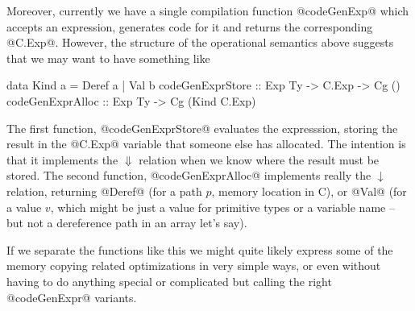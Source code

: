 \documentclass[nocopyrightspace,preprint,onecolumn,10pt]{sigplanconf}  %
\theoremstyle{remark}
\theoremstyle{definition}
\theoremstyle{plain}
\begin{document}
Moreover, currently we have a single compilation function @codeGenExp@
which accepts an expression, generates code for it and returns the
corresponding @C.Exp@. However, the structure of the operational
semantics above suggests that we may want to have something like

\begin{code}
data Kind a = Deref a | Val  b
codeGenExprStore :: Exp Ty -> C.Exp -> Cg ()
codeGenExprAlloc :: Exp Ty -> Cg (Kind C.Exp) 
\end{code}

The first function, @codeGenExprStore@ evaluates the expresssion, storing the result 
in the @C.Exp@ variable that someone else has allocated. The intention is that it 
implements the $\Downarrow$ relation when we know where the result must be stored. 
The second function, @codeGenExprAlloc@ implements really the $\downarrow$ relation, 
returning @Deref@ (for a path $p$, memory location in C), or @Val@ (for a value $v$, 
which might be just a value for primitive types or a variable name -- but not a 
dereference path in an array let's say).

If we separate the functions like this we might quite likely express some of the
memory copying related optimizations in very simple ways, or even without having
to do anything special or complicated but calling the right @codeGenExpr@ variants.


%
% 
% 
\end{document}
